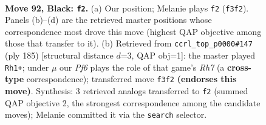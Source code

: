 \documentclass[11pt]{article}
\begin{document}
\begin{figure}[p]\centering
\begin{subfigure}{0.46\textwidth}\centering
\resizebox{\linewidth}{!}{%
\newchessgame
\chessboard[
  setfen={1R6/5k2/8/8/8/5p1K/8/3r4 b - - 1 92},
  showmover=false,
  pgfstyle=straightmove, color=movearrow, markmove={f3-f2}
]}
\caption{}
\end{subfigure}\hfill
\begin{subfigure}{0.46\textwidth}\centering
\resizebox{\linewidth}{!}{%
\newchessgame
\chessboard[
  setfen={1k6/8/8/8/8/2R5/7r/3K4 b - - 17 93},
  showmover=false,
  pgfstyle=straightmove, color=movearrow, markmove={h2-h1}
]}
\caption{}
\end{subfigure}
\\[4pt]

\caption{\textbf{Move 92, Black: \texttt{f2}.} (a) Our position; Melanie plays \texttt{f2} (\texttt{f3f2}). Panels (b)--(d) are the retrieved master positions whose correspondence most drove this move (highest QAP objective among those that transfer to it). (b) Retrieved from \texttt{ccrl\_top\_p0000\#147} (ply 185) [structural distance $d$=3, QAP obj=1]: the master played \texttt{Rh1+}; under $\mu$ our \emph{Pf6} plays the role of that game's \emph{Rh7} (a \textbf{cross-type} correspondence); transferred move \texttt{f3f2} \textbf{(endorses this move)}. Synthesis: 3 retrieved analogs transferred to \texttt{f2} (summed QAP objective 2, the strongest correspondence among the candidate moves); Melanie committed it via the \texttt{search} selector.}
\label{fig:thought-m183}
\end{figure}

\clearpage
\end{document}
